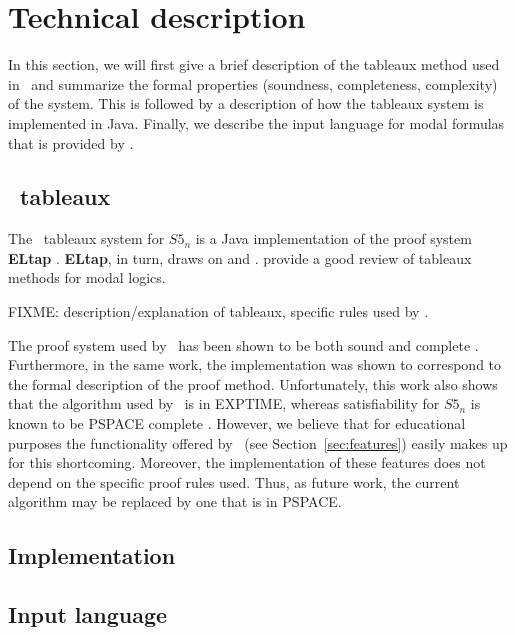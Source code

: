 \section{Technical description}

In this section, we will first give a brief description of the tableaux method
used in \oops\ and summarize the formal properties (soundness, completeness,
complexity) of the system. This is followed by a description of how the
tableaux system is implemented in Java. Finally, we describe the input language
for modal formulas that is provided by \oops.

\subsection{\oops\ tableaux}

The \oops\ tableaux system for $S5_n$ is a Java \citep{gosling2005}
implementation of the proof system {\bf ELtap} \citep{deboer2006}.  {\bf
ELtap}, in turn, draws on \citet{fitting1999} and \citet{beckert1997}.
\citet{halpern1992} provide a good review of tableaux methods for modal logics.

FIXME: description/explanation of tableaux, specific rules used by \oops.

The proof system used by \oops\ has been shown to be both sound and complete
\citep{valkenhoef2008}.  Furthermore, in the same work, the implementation was
shown to correspond to the formal description of the proof method.
Unfortunately, this work also shows that the algorithm used by \oops\ is in
{\sc EXPTIME}, whereas satisfiability for $S5_n$ is known to be {\sc PSPACE}
complete \citep{halpern1992}.
However, we believe that for educational purposes the functionality  offered
by \oops\ (see Section~\ref{sec:features}) easily makes up for this
shortcoming. Moreover, the implementation of these features does not depend on
the specific proof rules used. Thus, as future work, the current algorithm may
be replaced by one that is in {\sc PSPACE}.

\subsection{Implementation}

\subsection{Input language}
